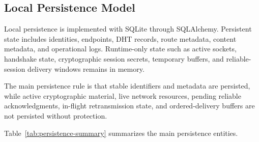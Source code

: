 \documentclass[12pt,a4paper]{article}
\begin{document}
\subsection{Local Persistence Model}
\label{sec:local-persistence-model}

Local persistence is implemented with SQLite through SQLAlchemy. Persistent state includes identities, endpoints, DHT records, route metadata, content metadata, and operational logs. Runtime-only state such as active sockets, handshake state, cryptographic session secrets, temporary buffers, and reliable-session delivery windows remains in memory.

The main persistence rule is that stable identifiers and metadata are persisted, while active cryptographic material, live network resources, pending reliable acknowledgments, in-flight retransmission state, and ordered-delivery buffers are not persisted without protection.

Table~\ref{tab:persistence-summary} summarizes the main persistence entities.
\end{document}
